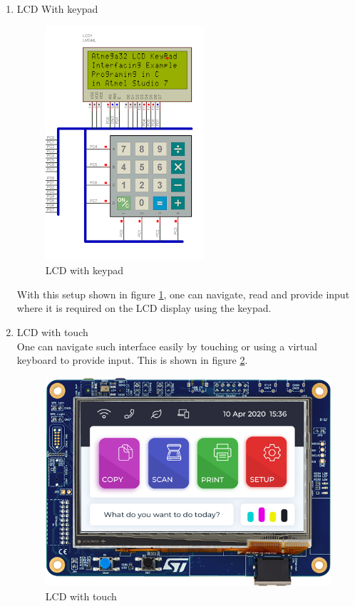 \begin{enumerate}
    \item LCD With keypad \\
    \begin{figure}[H]
        \centering
        \includegraphics{Figures/controlInterface.png}
        \caption[LCD with keypad]{LCD with keypad \cite{lcd_with_keypad}}
        \label{fig:lcd_with keypad}
    \end{figure}
    With this setup shown in figure \ref{fig:lcd_with keypad}, one can navigate, read and provide input where it is required on the LCD display using the keypad.
    \item LCD with touch \\
    One can navigate such interface easily by touching or using a virtual keyboard to provide input. This is shown in figure \ref{fig:lcd_with_touch}.
    \begin{figure}[H]
        \centering
        \includegraphics[width=0.6\linewidth]{Figures/lcdWithTouch.png}
        \caption[LCD with touch  ]{LCD with touch  \cite{lcd_with_touch}}
        \label{fig:lcd_with_touch}
    \end{figure}

\end{enumerate}
